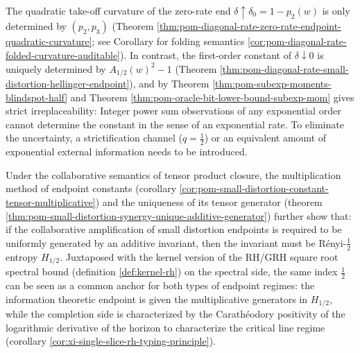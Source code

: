 \begin{remark}\label{rem:pom-endpoint-biphase-moment-vs-half}
The quadratic take-off curvature of the zero-rate end \(\delta\uparrow\delta_0=1-p_2(w)\) is only determined by \((p_2,p_3)\) (Theorem \ref{thm:pom-diagonal-rate-zero-rate-endpoint-quadratic-curvature}; see Corollary for folding semantics \ref{cor:pom-diagonal-rate-folded-curvature-auditable}).
In contrast, the first-order constant of \(\delta\downarrow 0\) is uniquely determined by \(A_{1/2}(w)^2-1\) (Theorem \ref{thm:pom-diagonal-rate-small-distortion-hellinger-endpoint}), and by Theorem \ref{thm:pom-subexp-moments-blindspot-half} and Theorem \ref{thm:pom-oracle-bit-lower-bound-subexp-mom} gives strict irreplaceability:
Integer power sum observations of any exponential order cannot determine the constant in the sense of an exponential rate. To eliminate the uncertainty, a strictification channel (\(q=\tfrac12\)) or an equivalent amount of exponential external information needs to be introduced.
\par
Under the collaborative semantics of tensor product closure, the multiplication method of endpoint constants (corollary \ref{cor:pom-small-distortion-constant-tensor-multiplicative}) and the uniqueness of its tensor generator (theorem \ref{thm:pom-small-distortion-synergy-unique-additive-generator}) further show that: if the collaborative amplification of small distortion endpoints is required to be uniformly generated by an additive invariant, then the invariant must be Rényi-\(\tfrac12\) entropy \(H_{1/2}\).
Juxtaposed with the kernel version of the RH/GRH square root spectral bound (definition \ref{def:kernel-rh}) on the spectral side, the same index \(\tfrac12\) can be seen as a common anchor for both types of endpoint regimes: the information theoretic endpoint is given the multiplicative generators in \(H_{1/2}\), while the completion side is characterized by the Carath\'eodory positivity of the logarithmic derivative of the horizon to characterize the critical line regime (corollary \ref{cor:xi-single-slice-rh-typing-principle}).
\end{remark}

